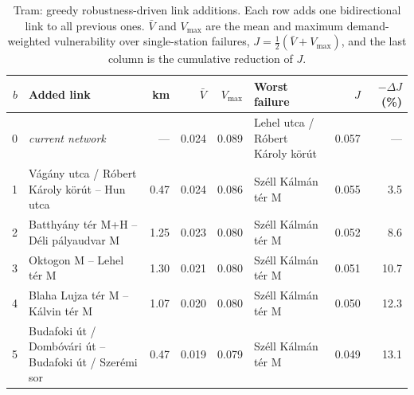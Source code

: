 \begin{table}[htbp]
\centering
\footnotesize
\begin{tabular}{r>{\raggedright\arraybackslash}p{5.0cm}rrr>{\raggedright\arraybackslash}p{3.0cm}rr}
\toprule
$b$ & Added link & km & $\bar V$ & $V_{\max}$ & Worst failure & $J$ & $-\Delta J$ (\%) \\
\midrule
0 & \emph{current network} & --- & 0.024 & 0.089 & Lehel utca / R\'obert K\'aroly k\"or\'ut & 0.057 & --- \\
1 & V\'ag\'any utca / R\'obert K\'aroly k\"or\'ut -- Hun utca & 0.47 & 0.024 & 0.086 & Sz\'ell K\'alm\'an t\'er M & 0.055 & 3.5 \\
2 & Batthy\'any t\'er M+H -- D\'eli p\'alyaudvar M & 1.25 & 0.023 & 0.080 & Sz\'ell K\'alm\'an t\'er M & 0.052 & 8.6 \\
3 & Oktogon M -- Lehel t\'er M & 1.30 & 0.021 & 0.080 & Sz\'ell K\'alm\'an t\'er M & 0.051 & 10.7 \\
4 & Blaha Lujza t\'er M -- K\'alvin t\'er M & 1.07 & 0.020 & 0.080 & Sz\'ell K\'alm\'an t\'er M & 0.050 & 12.3 \\
5 & Budafoki \'ut / Domb\'ov\'ari \'ut -- Budafoki \'ut / Szer\'emi sor & 0.47 & 0.019 & 0.079 & Sz\'ell K\'alm\'an t\'er M & 0.049 & 13.1 \\
\bottomrule
\end{tabular}
\caption{Tram: greedy robustness-driven link additions. Each row adds one bidirectional link to all previous ones. $\bar V$ and $V_{\max}$ are the mean and maximum demand-weighted vulnerability over single-station failures, $J=\tfrac12(\bar V+V_{\max})$, and the last column is the cumulative reduction of $J$.}
\label{tab:aug-tram}
\end{table}
